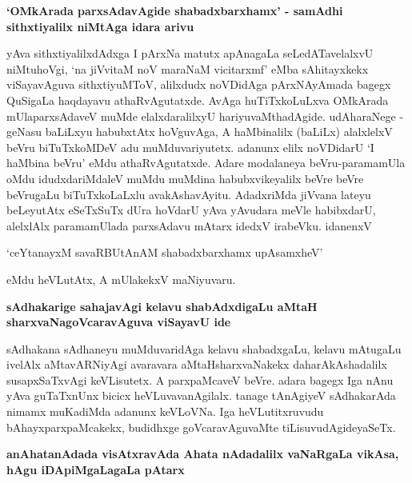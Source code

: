 {\bigskip
\noindent
{\large\bf `OMkArada parxsAdavAgide shabadxbarxhamx' - samAdhi sithxtiyalilx niMtAga idara arivu}}\label{page203}
\medskip

\noindent
yAva sithxtiyalilxdAdxga I pArxNa matutx apAnagaLa seLedATavelalxvU niMtuhoVgi, `na jiVvitaM noV\- maraNaM vicitarxmf' eMba sAhitayxkekx viSayavAguva sithxtiyuMToV, alilxdudx noVDidAga pArxNA\-yAmada bagegx QuSigaLa haqdayavu athaRvAgutatxde. AvAga huTiTxkoLuLxva OMkArada mUlaparxsAdaveV muMde elalxdaralilxyU hariyuvaMthadAgide. udAharaNege - geNasu baLiLxyu habubxtAtx hoVgu\-vAga, A haMbinalilx (baLiLx) alalxlelxV beVru biTuTxkoMDeV adu muMduvariyutetx. adanunx elilx noVDi\-darU `I haMbina beVru' eMdu athaRvAgutatxde. Adare modalaneya beVru-paramamUla oMdu idudxda\-riMdaleV muMdu muMdina habubxvikeyalilx beVre beVre beVrugaLu biTuTxkoLaLxlu avakAshavAyitu. AdadxriMda jiVvana lateyu beLeyutAtx eSeTxSuTx dUra hoVdarU yAva yAvudara meVle habibxdarU, alelxlAlx paramamUlada parxsAdavu mAtarx idedxV irabeVku. idanenxV

\begin{artha}
`ceYtanayxM savaRBUtAnAM shabadxbarxhamx upAsamxheV' 
\end{artha}

\noindent
eMdu heVLutAtx, A mUlakekxV maNiyuvaru.\label{203}

{\bigskip
\noindent
{\large\bf sAdhakarige sahajavAgi kelavu shabAdxdigaLu aMtaH sharxvaNagoVcaravAguva viSayavU ide}}\label{page203}
\medskip

\noindent
sAdhakana sAdhaneyu muMduvaridAga kelavu shabadxgaLu, kelavu mAtugaLu ivelAlx aMtavARNi\-yAgi avaravara aMtaHsharxvaNakekx daharAkAshadalilx susapxSaTxvAgi keVLisutetx. A parxpaMcaveV beVre. adara bagegx Iga nAnu yAva guTaTxnUnx bicicx heVLuvavanAgilalx. tanage tAnAgiyeV sAdhakarAda nimamx muKa\-diMda adanunx keVLoVNa. Iga heVLutitxruvudu bAhayxparxpaMcakekx, budidhxge goVcaravAguvaMte tiLisuvudAgide\-yaSeTx.

{\bigskip
\noindent
{\large\bf anAhatanAdada visAtxravAda Ahata nAdadalilx vaNaRgaLa vikAsa, hAgu iDApiMgaLagaLa pAtarx}}\label{page211}
\medskip


